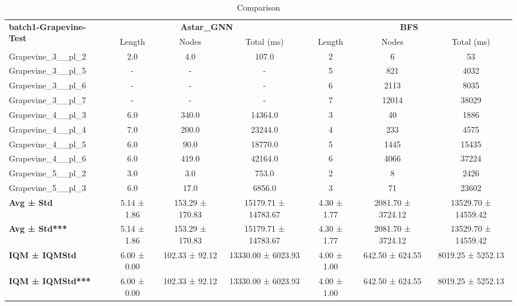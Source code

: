 \begin{table}[!ht]
\centering
\small
\begin{tabular}{l|ccc|ccc}
\multirow{2}{*}{\textbf{batch1-Grapevine-Test}} & \multicolumn{3}{c|}{\textbf{Astar\_GNN}} & \multicolumn{3}{c}{\textbf{BFS}} \\
\cline{2-7}
& Length & Nodes & Total (ms) & Length & Nodes & Total (ms) \\
\hline
Grapevine\_3\_\_pl\_2 & 2.0 & 4.0 & 107.0 & 2 & 6 & 53 \\
Grapevine\_3\_\_pl\_5 & - & - & - & 5 & 821 & 4032 \\
Grapevine\_3\_\_pl\_6 & - & - & - & 6 & 2113 & 8035 \\
Grapevine\_3\_\_pl\_7 & - & - & - & 7 & 12014 & 38029 \\
Grapevine\_4\_\_pl\_3 & 6.0 & 340.0 & 14364.0 & 3 & 40 & 1886 \\
Grapevine\_4\_\_pl\_4 & 7.0 & 200.0 & 23244.0 & 4 & 233 & 4575 \\
Grapevine\_4\_\_pl\_5 & 6.0 & 90.0 & 18770.0 & 5 & 1445 & 15435 \\
Grapevine\_4\_\_pl\_6 & 6.0 & 419.0 & 42164.0 & 6 & 4066 & 37224 \\
Grapevine\_5\_\_pl\_2 & 3.0 & 3.0 & 753.0 & 2 & 8 & 2426 \\
Grapevine\_5\_\_pl\_3 & 6.0 & 17.0 & 6856.0 & 3 & 71 & 23602 \\
\hline
\textbf{Avg ± Std} & 5.14 ± 1.86 & 153.29 ± 170.83 & 15179.71 ± 14783.67 & 4.30 ± 1.77 & 2081.70 ± 3724.12 & 13529.70 ± 14559.42 \\
\textbf{Avg ± Std***} & 5.14 ± 1.86 & 153.29 ± 170.83 & 15179.71 ± 14783.67 & 4.30 ± 1.77 & 2081.70 ± 3724.12 & 13529.70 ± 14559.42 \\
\textbf{IQM ± IQMStd} & 6.00 ± 0.00 & 102.33 ± 92.12 & 13330.00 ± 6023.93 & 4.00 ± 1.00 & 642.50 ± 624.55 & 8019.25 ± 5252.13 \\
\textbf{IQM ± IQMStd***} & 6.00 ± 0.00 & 102.33 ± 92.12 & 13330.00 ± 6023.93 & 4.00 ± 1.00 & 642.50 ± 624.55 & 8019.25 ± 5252.13 \\
\end{tabular}
\caption{Comparison}
\label{tab:batch1_Grapevine_comparison_test}
\end{table}
